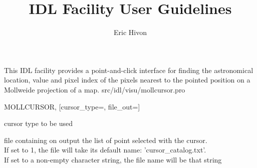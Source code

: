 




\sloppy



\title{\healpix IDL Facility User Guidelines}
 \section[mollcursor]{ }
\label{idl:\thedocid}
\author{Eric Hivon}




\begin{facility}
{This IDL facility provides a point-and-click interface for finding
the astronomical location, value and pixel index of the pixels nearest 
to the pointed position on a Mollweide projection of a \healpix map.}
{src/idl/visu/mollcursor.pro}
\end{facility}


\begin{IDLformat}
{MOLLCURSOR, [cursor\_type=, file\_out=]}
\end{IDLformat}

\begin{qualifiers}
  \begin{qulist}{} %
 	\item[{cursor\_type=}] cursor type to be used \\
 	\item[{file\_out=}] file containing on output the list of
 	point selected with the cursor. \\
	If set to 1, the file will
 	take its default name: 'cursor\_catalog.txt'. \\
	If set to a non-empty character string, the file name will be that string
  \end{qulist}
\end{qualifiers}

